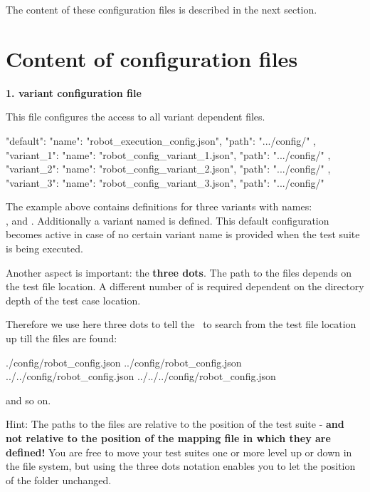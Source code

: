 The content of these configuration files is described in the next section.


\section{Content of configuration files}

\textbf{1. variant configuration file}

This file configures the access to all variant dependent  files.

\begin{pythoncode}
{
  "default": {
               "name": "robot_execution_config.json",
               "path": ".../config/"
             },
  "variant_1": {
                 "name": "robot_config_variant_1.json",
                 "path": ".../config/"
               },
  "variant_2": {
                 "name": "robot_config_variant_2.json",
                 "path": ".../config/"
               },
  "variant_3": {
                 "name": "robot_config_variant_3.json",
                 "path": ".../config/"
               }
}
\end{pythoncode}

The example above contains definitions for three variants with names:\\
,  and . Additionally a variant named  is defined.
This default configuration becomes active in case of no certain variant name is provided when the test suite is being executed.

Another aspect is important: the \textbf{three dots}.
The path to the  files depends on the test file location. A
different number of  is required dependent on the directory depth of the test
case location.

Therefore we use here three dots to tell the \pkg\ to search from the test
file location up till the  files are found:

\begin{pythonlog}
./config/robot_config.json
../config/robot_config.json
../../config/robot_config.json
../../../config/robot_config.json
\end{pythonlog}

and so on.

Hint: The paths to the  files are relative to the position of the test suite - \textbf{and not relative to the position of the
mapping file in which they are defined!} You are free to move your test suites one or more level up or down in the file system, but using the
three dots notation enables you to let the position of the  folder unchanged.

